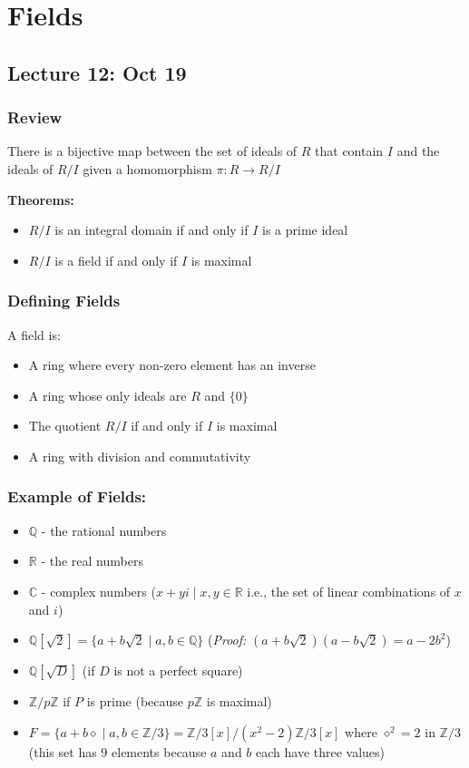 \documentclass[12pt]{report}
\newcommand{\R}{\mathbb{R}}
\newcommand{\Z}{\mathbb{Z}}
\begin{document}
\chapter*{Fields}
\section*{Lecture 12: Oct 19}
\subsection*{Review}
There is a bijective map between the set of ideals of $R$ that contain $I$ and the ideals of $R/I$ given a homomorphism $\pi: R \to R/I$

\textbf{Theorems:}
\begin{itemize}
    \item $R/I$ is an integral domain if and only if $I$ is a prime ideal
    \item $R/I$ is a field if and only if $I$ is maximal 
\end{itemize}

\subsection*{Defining Fields} 
A field is:
\begin{itemize}
    \item A ring where every non-zero element has an inverse 
    \item A ring whose only ideals are $R$ and $\{0\}$
    \item The quotient $R/I$ if and only if $I$ is maximal
    \item A ring with division and commutativity
\end{itemize}

\subsection*{Example of Fields:}
\begin{itemize}
    \item $\mathbb{Q}$ - the rational numbers 
    \item $\R$ - the real numbers 
    \item $\mathbb{C}$ - complex numbers ($x + yi \; | \; x, y \in \R$ i.e., the set of linear combinations of $x$ and $i$)
    \item $\mathbb{Q}[\sqrt 2] = \{a + b\sqrt 2 \; | \; a,b\in \mathbb{Q}\}$ (\emph{Proof:} $(a + b\sqrt 2)(a - b\sqrt 2) = a - 2b^2$)
    \item $\mathbb{Q}[\sqrt D]$ (if $D$ is not a perfect square)
    \item $\Z/p\Z$ if $P$ is prime (because $p\Z$ is maximal)
    \item $F =\{a + b \diamond \; | \; a, b \in \Z/3\} = \Z/3[x]/(x^2 -2)\Z/3[x]$ where $\diamond^2 = 2$ in $\Z/3$ (this set has $9$ elements because $a$ and $b$ each have three values)
\end{itemize}
\end{document}
